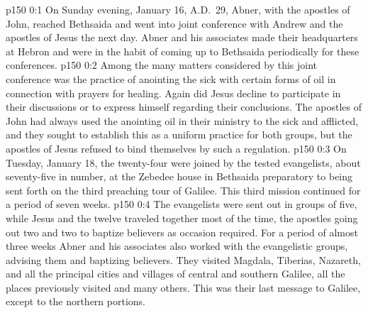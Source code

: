 \author{Midwayer Commission}
\vs p150 0:1 On Sunday evening, January 16, A.D.~29, Abner, with the apostles of John, reached Bethsaida and went into joint conference with Andrew and the apostles of Jesus the next day. Abner and his associates made their headquarters at Hebron and were in the habit of coming up to Bethsaida periodically for these conferences.
\vs p150 0:2 Among the many matters considered by this joint conference was the practice of anointing the sick with certain forms of oil in connection with prayers for healing. Again did Jesus decline to participate in their discussions or to express himself regarding their conclusions. The apostles of John had always used the anointing oil in their ministry to the sick and afflicted, and they sought to establish this as a uniform practice for both groups, but the apostles of Jesus refused to bind themselves by such a regulation.
\pc \vs p150 0:3 On Tuesday, January 18, the twenty\hyp{}four were joined by the tested evangelists, about seventy\hyp{}five in number, at the Zebedee house in Bethsaida preparatory to being sent forth on the third preaching tour of Galilee. This third mission continued for a period of seven weeks.
\vs p150 0:4 The evangelists were sent out in groups of five, while Jesus and the twelve traveled together most of the time, the apostles going out two and two to baptize believers as occasion required. For a period of almost three weeks Abner and his associates also worked with the evangelistic groups, advising them and baptizing believers. They visited Magdala, Tiberias, Nazareth, and all the principal cities and villages of central and southern Galilee, all the places previously visited and many others. This was their last message to Galilee, except to the northern portions.

